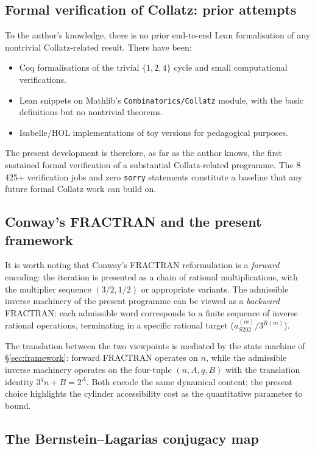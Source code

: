 \documentclass[11pt,a4paper]{article}
\theoremstyle{plain}
\theoremstyle{definition}
\newcommand{\aSat}{a_{S202}^{(m)}}
\begin{document}
\subsection{Formal verification of Collatz: prior attempts}

To the author's knowledge, there is no prior end-to-end Lean
formalisation of any nontrivial Collatz-related result. There
have been:
\begin{itemize}
   \item Coq formalisations of the trivial $\{1, 2, 4\}$ cycle
         and small computational verifications.
   \item Lean snippets on Mathlib's \texttt{Combinatorics/Collatz}
         module, with the basic definitions but no nontrivial
         theorems.
   \item Isabelle/HOL implementations of toy versions for
         pedagogical purposes.
\end{itemize}

The present development is therefore, as far as the author knows,
the first sustained formal verification of a substantial
Collatz-related programme. The 8\,425+ verification jobs and
zero \texttt{sorry} statements constitute a baseline that any
future formal Collatz work can build on.

\subsection{Conway's FRACTRAN and the present framework}

It is worth noting that Conway's FRACTRAN reformulation is a
\emph{forward} encoding: the iteration is presented as a chain of
rational multiplications, with the multiplier sequence
$(3/2, 1/2)$ or appropriate variants. The admissible inverse
machinery of the present programme can be viewed as a
\emph{backward} FRACTRAN: each admissible word corresponds to a
finite sequence of inverse rational operations, terminating in a
specific rational target ($\aSat / 3^{R(m)}$).

The translation between the two viewpoints is mediated by the
state machine of \S\ref{sec:framework}: forward FRACTRAN
operates on $n$, while the admissible inverse machinery operates
on the four-tuple $(n, A, q, B)$ with the translation identity
$3^q n + B = 2^A$. Both encode the same dynamical content; the
present choice highlights the cylinder accessibility cost as the
quantitative parameter to bound.

\subsection{The Bernstein--Lagarias conjugacy map}
\end{document}
